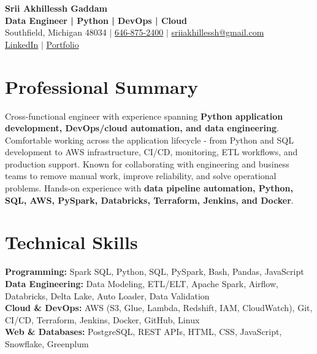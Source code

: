 \documentclass[letterpaper,10pt]{article}
\begin{document}
\fontsize{9.35pt}{10.45pt}\selectfont

\begin{center}
    {\LARGE \textbf{Srii Akhillessh Gaddam}} \\[-1pt]
    \textbf{Data Engineer | Python | DevOps | Cloud} \\[2pt]
    Southfield, Michigan 48034 $|$
    \href{tel:6468752400}{646-875-2400} $|$
    \href{mailto:sriiakhillessh@gmail.com}{sriiakhillessh@gmail.com} \\[1pt]
    \href{https://www.linkedin.com/in/srii-akhiilessh-gaddam-b48668191/}{LinkedIn} $|$
    \href{https://sriiakhillesshg.github.io/portfolio/}{Portfolio}
\end{center}
\vspace{-8pt}

\section{Professional Summary}
\small{Cross-functional engineer with experience spanning \textbf{Python application development, DevOps/cloud automation, and data engineering}. Comfortable working across the application lifecycle - from Python and SQL development to AWS infrastructure, CI/CD, monitoring, ETL workflows, and production support. Known for collaborating with engineering and business teams to remove manual work, improve reliability, and solve operational problems. Hands-on experience with \textbf{data pipeline automation, Python, SQL, AWS, PySpark, Databricks, Terraform, Jenkins, and Docker}.}

\section{Technical Skills}
\small{
\textbf{Programming:} Spark SQL, Python, SQL, PySpark, Bash, Pandas, JavaScript \\
\textbf{Data Engineering:} Data Modeling, ETL/ELT, Apache Spark, Airflow, Databricks, Delta Lake, Auto Loader, Data Validation \\
\textbf{Cloud \& DevOps:} AWS (S3, Glue, Lambda, Redshift, IAM, CloudWatch), Git, CI/CD, Terraform, Jenkins, Docker, GitHub, Linux \\
\textbf{Web \& Databases:} PostgreSQL, REST APIs, HTML, CSS, JavaScript, Snowflake, Greenplum
}

\end{document}
